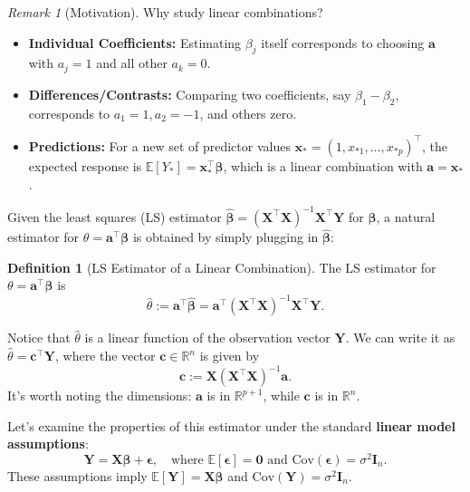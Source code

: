 \documentclass[11pt, letterpaper]{article}
\theoremstyle{plain} %
\theoremstyle{definition} %
\newtheorem{definition}[theorem]{Definition}
\theoremstyle{remark} %
\newtheorem{remark}[theorem]{Remark}
\renewcommand{\mathbf}{\boldsymbol} %
\newcommand{\R}{\mathbb{R}}
\newcommand{\E}{\mathbb{E}}
\newcommand{\Cov}{\mathrm{Cov}} %
\newcommand{\I}{\mathbf{I}} %
\begin{document}
\begin{remark}[Motivation]
Why study linear combinations?
\begin{itemize}
    \item \textbf{Individual Coefficients:} Estimating $\beta_j$ itself corresponds to choosing $\boldsymbol{a}$ with $a_j=1$ and all other $a_k=0$.
    \item \textbf{Differences/Contrasts:} Comparing two coefficients, say $\beta_1 - \beta_2$, corresponds to $a_1=1, a_2=-1$, and others zero.
    \item \textbf{Predictions:} For a new set of predictor values $\boldsymbol{x}_* = (1, x_{*1}, \ldots, x_{*p})^{\top}$, the expected response is $\E[Y_*] = \boldsymbol{x}_*^{\top} \boldsymbol{\beta}$, which is a linear combination with $\boldsymbol{a} = \boldsymbol{x}_*$.
\end{itemize}
\end{remark}

Given the least squares (LS) estimator $\hat{\boldsymbol{\beta}} = (\boldsymbol{X}^{\top}\boldsymbol{X})^{-1}\boldsymbol{X}^{\top}\boldsymbol{Y}$ for $\boldsymbol{\beta}$, a natural estimator for $\theta = \boldsymbol{a}^{\top}\boldsymbol{\beta}$ is obtained by simply plugging in $\hat{\boldsymbol{\beta}}$:

\begin{definition}[LS Estimator of a Linear Combination]
The LS estimator for $\theta = \boldsymbol{a}^{\top}\boldsymbol{\beta}$ is
\begin{equation}
\hat{\theta} := \boldsymbol{a}^{\top} \hat{\boldsymbol{\beta}} = \boldsymbol{a}^{\top} (\boldsymbol{X}^{\top}\boldsymbol{X})^{-1} \boldsymbol{X}^{\top} \boldsymbol{Y}.
\end{equation}
\end{definition}

Notice that $\hat{\theta}$ is a linear function of the observation vector $\boldsymbol{Y}$. We can write it as $\hat{\theta} = \boldsymbol{c}^{\top} \boldsymbol{Y}$, where the vector $\boldsymbol{c} \in \R^n$ is given by
\begin{equation}
\boldsymbol{c} := \boldsymbol{X} (\boldsymbol{X}^{\top}\boldsymbol{X})^{-1} \boldsymbol{a}.
\end{equation}
It's worth noting the dimensions: $\boldsymbol{a}$ is in $\R^{p+1}$, while $\boldsymbol{c}$ is in $\R^n$.

Let's examine the properties of this estimator under the standard \textbf{linear model assumptions}:
\begin{equation} \label{eq:linear_model_assumptions}
\boldsymbol{Y} = \boldsymbol{X}\boldsymbol{\beta} + \boldsymbol{\epsilon}, \quad \text{where } \E[\boldsymbol{\epsilon}] = \mathbf{0} \text{ and } \Cov(\boldsymbol{\epsilon}) = \sigma^2 \I_n.
\end{equation}
These assumptions imply $\E[\boldsymbol{Y}] = \boldsymbol{X}\boldsymbol{\beta}$ and $\Cov(\boldsymbol{Y}) = \sigma^2 \I_n$.
\end{document}
